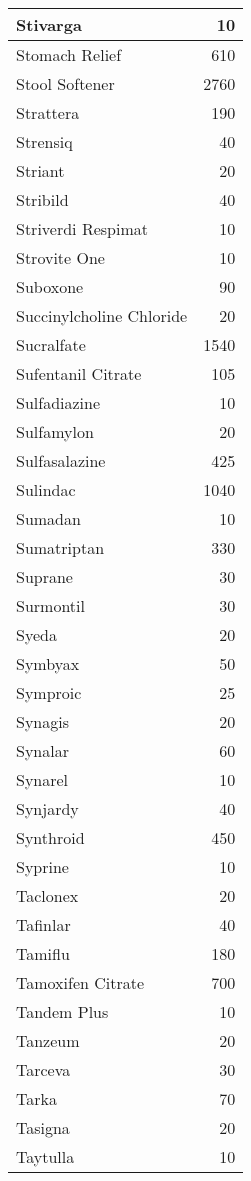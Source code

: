 \documentclass[
]{article}
\begin{document}
\begin{table}
\begin{tabular}[t]{l|r}
\hline
Stivarga & 10\\
\hline
Stomach Relief & 610\\
\hline
Stool Softener & 2760\\
\hline
Strattera & 190\\
\hline
Strensiq & 40\\
\hline
Striant & 20\\
\hline
Stribild & 40\\
\hline
Striverdi Respimat & 10\\
\hline
Strovite One & 10\\
\hline
Suboxone & 90\\
\hline
Succinylcholine Chloride & 20\\
\hline
Sucralfate & 1540\\
\hline
Sufentanil Citrate & 105\\
\hline
Sulfadiazine & 10\\
\hline
Sulfamylon & 20\\
\hline
Sulfasalazine & 425\\
\hline
Sulindac & 1040\\
\hline
Sumadan & 10\\
\hline
Sumatriptan & 330\\
\hline
Suprane & 30\\
\hline
Surmontil & 30\\
\hline
Syeda & 20\\
\hline
Symbyax & 50\\
\hline
Symproic & 25\\
\hline
Synagis & 20\\
\hline
Synalar & 60\\
\hline
Synarel & 10\\
\hline
Synjardy & 40\\
\hline
Synthroid & 450\\
\hline
Syprine & 10\\
\hline
Taclonex & 20\\
\hline
Tafinlar & 40\\
\hline
Tamiflu & 180\\
\hline
Tamoxifen Citrate & 700\\
\hline
Tandem Plus & 10\\
\hline
Tanzeum & 20\\
\hline
Tarceva & 30\\
\hline
Tarka & 70\\
\hline
Tasigna & 20\\
\hline
Taytulla & 10\\
\hline

\end{tabular}
\end{table}
\end{document}
